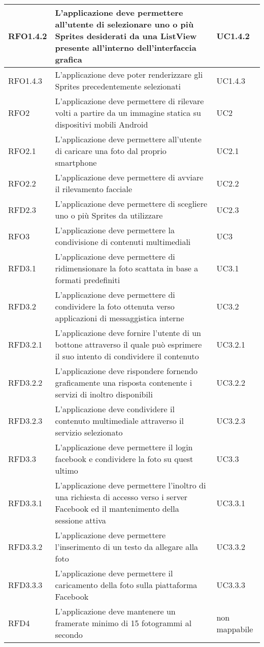 \begin{center}
\begin{longtable}{ | p{2cm} | p{7cm} | p{2cm} |}
    RFO1.4.2 &  L'applicazione deve permettere all'utente di selezionare uno o più Sprites desiderati da una ListView presente all'interno dell'interfaccia grafica  & UC1.4.2  \\ \hline
    RFO1.4.3 &  L'applicazione deve poter renderizzare gli Sprites precedentemente selezionati & UC1.4.3  \\ \hline    
    RFO2 &  L'applicazione deve permettere di rilevare volti a partire da un immagine statica su dispositivi mobili Android & UC2  \\ \hline
    RFO2.1 &  L'applicazione deve permettere all'utente di caricare una foto dal proprio smartphone & UC2.1  \\ \hline 
    RFO2.2 &  L'applicazione deve permettere di avviare il rilevamento facciale & UC2.2 \\ \hline
    RFD2.3 &   L'applicazione deve permettere di scegliere uno o più Sprites da utilizzare  & UC2.3  \\ \hline 
    RFO3 &  L'applicazione deve permettere la condivisione di contenuti multimediali & UC3 \\ \hline
    RFD3.1 &  L'applicazione deve permettere di ridimensionare la foto scattata in base a formati predefiniti & UC3.1 \\ \hline
    RFD3.2 &  L'applicazione deve permettere di condividere la foto ottenuta verso applicazioni di messaggistica interne  & UC3.2 \\ \hline
    RFD3.2.1 &  L'applicazione deve fornire l'utente di un bottone attraverso il quale può esprimere il suo intento di condividere il contenuto  & UC3.2.1 \\ \hline
    RFD3.2.2 &  L'applicazione deve rispondere fornendo graficamente una risposta contenente i servizi di inoltro disponibili  & UC3.2.2 \\ \hline
    RFD3.2.3 &  L'applicazione deve condividere il contenuto multimediale attraverso il servizio selezionato  & UC3.2.3 \\ \hline    
    RFD3.3 &  L'applicazione deve permettere il login facebook e condividere la foto su quest ultimo  & UC3.3 \\ \hline
    RFD3.3.1 &  L'applicazione deve permettere l'inoltro di una richiesta di accesso verso i server Facebook ed il mantenimento della sessione attiva & UC3.3.1 \\ \hline
    RFD3.3.2 &  L'applicazione deve permettere l'inserimento di un testo da allegare alla foto & UC3.3.2 \\ \hline
    RFD3.3.3 &  L'applicazione deve permettere il caricamento della foto sulla piattaforma Facebook & UC3.3.3 \\ \hline
    RFD4 &  L'applicazione deve mantenere un framerate minimo di 15 fotogrammi al secondo & non mappabile \\ \hline
    \end{longtable}
    \end{center}
